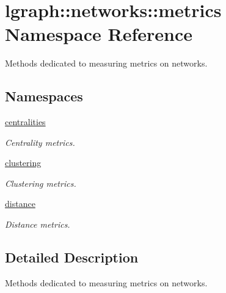 \hypertarget{namespacelgraph_1_1networks_1_1metrics}{}\section{lgraph\+:\+:networks\+:\+:metrics Namespace Reference}
\label{namespacelgraph_1_1networks_1_1metrics}


Methods dedicated to measuring metrics on networks.  


\subsection*{Namespaces}
\begin{DoxyCompactItemize}
\item 
 \hyperlink{namespacelgraph_1_1networks_1_1metrics_1_1centralities}{centralities}
\begin{DoxyCompactList}\small\item\em Centrality metrics. \end{DoxyCompactList}\item 
 \hyperlink{namespacelgraph_1_1networks_1_1metrics_1_1clustering}{clustering}
\begin{DoxyCompactList}\small\item\em Clustering metrics. \end{DoxyCompactList}\item 
 \hyperlink{namespacelgraph_1_1networks_1_1metrics_1_1distance}{distance}
\begin{DoxyCompactList}\small\item\em Distance metrics. \end{DoxyCompactList}\end{DoxyCompactItemize}


\subsection{Detailed Description}
Methods dedicated to measuring metrics on networks. 